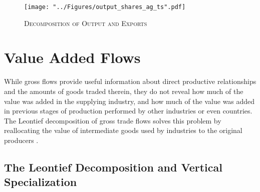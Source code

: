\documentclass[a4paper]{article}
\begin{document}


\begin{figure}[h!]
\centering
\caption{\label{fig:outshares_ag_ts}\textsc{Decomposition of Output and Exports}}
\texttt{[image: "../Figures/output\_shares\_ag\_ts".pdf]} %
\end{figure}
\FloatBarrier


\section{Value Added Flows}
While gross flows provide useful information about direct productive relationships and the amounts of goods traded therein, they do not reveal how much of the value was added in the supplying industry, and how much of the value was added in previous stages of production performed by other industries or even countries. %
The Leontief decomposition of gross trade flows solves this problem by reallocating the value of intermediate goods used by industries to the original producers \citep{Kummritz2014}. %


\subsection{The Leontief Decomposition and Vertical Specialization}
\end{document}
